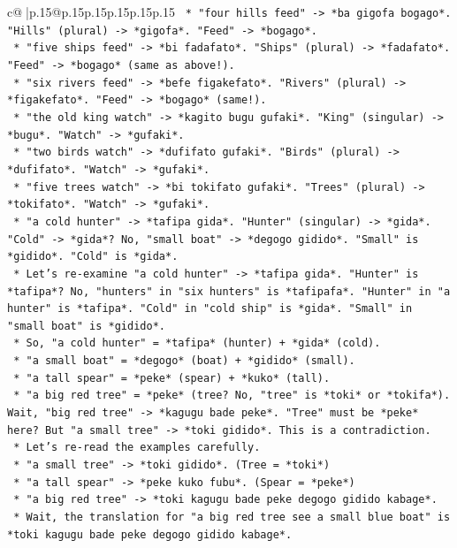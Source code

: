 \documentclass{article}
\begin{document}
{\begin{supertabular}{c@{$\;$}|p{.15\linewidth}@{}p{.15\linewidth}p{.15\linewidth}p{.15\linewidth}p{.15\linewidth}p{.15\linewidth}}
{{{\texttt{    *   "four hills feed" {-}> *ba gigofa bogago*. "Hills" (plural) {-}> *gigofa*. "Feed" {-}> *bogago*.} \\
\texttt{    *   "five ships feed" {-}> *bi fadafato*. "Ships" (plural) {-}> *fadafato*. "Feed" {-}> *bogago* (same as above!).} \\
\texttt{    *   "six rivers feed" {-}> *befe figakefato*. "Rivers" (plural) {-}> *figakefato*. "Feed" {-}> *bogago* (same!).} \\
\texttt{    *   "the old king watch" {-}> *kagito bugu gufaki*. "King" (singular) {-}> *bugu*. "Watch" {-}> *gufaki*.} \\
\texttt{    *   "two birds watch" {-}> *dufifato gufaki*. "Birds" (plural) {-}> *dufifato*. "Watch" {-}> *gufaki*.} \\
\texttt{    *   "five trees watch" {-}> *bi tokifato gufaki*. "Trees" (plural) {-}> *tokifato*. "Watch" {-}> *gufaki*.} \\
\texttt{    *   "a cold hunter" {-}> *tafipa gida*. "Hunter" (singular) {-}> *gida*. "Cold" {-}> *gida*? No, "small boat" {-}> *degogo gidido*. "Small" is *gidido*. "Cold" is *gida*.} \\
\texttt{    *   Let's re{-}examine "a cold hunter" {-}> *tafipa gida*. "Hunter" is *tafipa*? No, "hunters" in "six hunters" is *tafipafa*. "Hunter" in "a hunter" is *tafipa*. "Cold" in "cold ship" is *gida*. "Small" in "small boat" is *gidido*.} \\
\texttt{    *   So, "a cold hunter" = *tafipa* (hunter) + *gida* (cold).} \\
\texttt{    *   "a small boat" = *degogo* (boat) + *gidido* (small).} \\
\texttt{    *   "a tall spear" = *peke* (spear) + *kuko* (tall).} \\
\texttt{    *   "a big red tree" = *peke* (tree? No, "tree" is *toki* or *tokifa*). Wait, "big red tree" {-}> *kagugu bade peke*. "Tree" must be *peke* here? But "a small tree" {-}> *toki gidido*. This is a contradiction.} \\
\texttt{    *   Let's re{-}read the examples carefully.} \\
\texttt{        *   "a small tree" {-}> *toki gidido*. (Tree = *toki*)} \\
\texttt{        *   "a tall spear" {-}> *peke kuko fubu*. (Spear = *peke*)} \\
\texttt{        *   "a big red tree" {-}> *toki kagugu bade peke degogo gidido kabage*.} \\
\texttt{            *   Wait, the translation for "a big red tree see a small blue boat" is *toki kagugu bade peke degogo gidido kabage*.} \\
}}}
\end{supertabular}}
\end{document}
